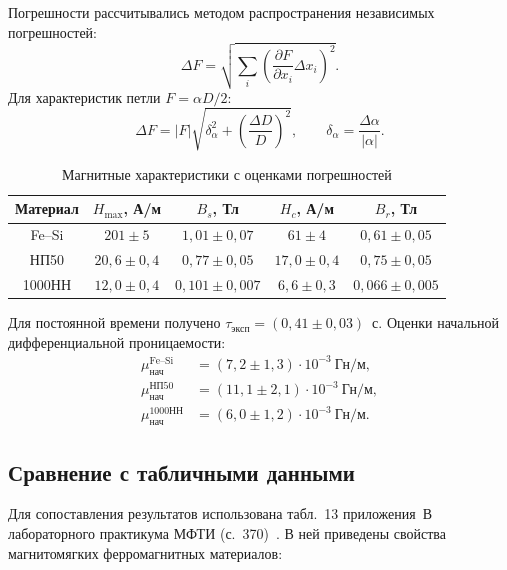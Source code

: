 \documentclass[12pt,a4paper]{article}
\begin{document}
Погрешности рассчитывались методом распространения независимых
погрешностей:
\begin{equation}
 \Delta F=\sqrt{\sum_i\left(
   \frac{\partial F}{\partial x_i}\Delta x_i\right)^2}.
 \label{eq:error_propagation}
\end{equation}
Для характеристик петли $F=\alpha D/2$:
\begin{equation}
 \Delta F=|F|\sqrt{\delta_{\alpha}^2+
                 \left(\frac{\Delta D}{D}\right)^2},
 \qquad \delta_{\alpha}=\frac{\Delta\alpha}{|\alpha|}.
 \label{eq:error_loop}
\end{equation}

\begin{table}[H]
 \centering
 \caption{Магнитные характеристики с оценками погрешностей}
 \label{tab:results_errors}
 \small
 \setlength{\tabcolsep}{4.2pt}
 \begin{tabular}{c c c c c}
 \toprule
 Материал & $H_{\max}$, А/м & $B_s$, Тл & $H_c$, А/м & $B_r$, Тл \\
 \midrule
 Fe--Si & $201\pm5$    & $1{,}01\pm0{,}07$ & $61\pm4$     & $0{,}61\pm0{,}05$ \\
 НП50 & $20{,}6\pm0{,}4$ & $0{,}77\pm0{,}05$ & $17{,}0\pm0{,}4$ & $0{,}75\pm0{,}05$ \\
 1000НН & $12{,}0\pm0{,}4$ & $0{,}101\pm0{,}007$ & $6{,}6\pm0{,}3$ & $0{,}066\pm0{,}005$ \\
 \bottomrule
 \end{tabular}
\end{table}

Для постоянной времени получено
$\tau_{\text{эксп}}=(0{,}41\pm0{,}03)$~с.
Оценки начальной дифференциальной проницаемости:
\[
\begin{aligned}
 \mu_{\text{нач}}^{\text{Fe--Si}}&=(7{,}2\pm1{,}3)\cdot10^{-3}\ \text{Гн/м},\\
 \mu_{\text{нач}}^{\text{НП50}}&=(11{,}1\pm2{,}1)\cdot10^{-3}\ \text{Гн/м},\\
 \mu_{\text{нач}}^{\text{1000НН}}&=(6{,}0\pm1{,}2)\cdot10^{-3}\ \text{Гн/м}.
\end{aligned}
\]

\clearpage
\subsection{Сравнение с табличными данными}

Для сопоставления результатов использована табл.~13 приложения~В
лабораторного практикума МФТИ (с.~370)~\cite{ref:practicum}.
В ней приведены свойства магнитомягких ферромагнитных материалов:
\end{document}
